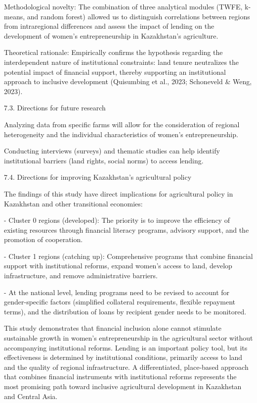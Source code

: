\documentclass[
]{article}
\begin{document}
Methodological novelty: The combination of three analytical modules
(TWFE, k-means, and random forest) allowed us to distinguish
correlations between regions from intraregional differences and assess
the impact of lending on the development of women's entrepreneurship in
Kazakhstan's agriculture.

Theoretical rationale: Empirically confirms the hypothesis regarding the
interdependent nature of institutional constraints: land tenure
neutralizes the potential impact of financial support, thereby
supporting an institutional approach to inclusive development
(Quisumbing et al., 2023; Schoneveld \& Weng, 2023).

7.3. Directions for future research

Analyzing data from specific farms will allow for the consideration of
regional heterogeneity and the individual characteristics of women's
entrepreneurship.

Conducting interviews (surveys) and thematic studies can help identify
institutional barriers (land rights, social norms) to access lending.

7.4. Directions for improving Kazakhstan's agricultural policy

The findings of this study have direct implications for agricultural
policy in Kazakhstan and other transitional economies:

- Cluster 0 regions (developed): The priority is to improve the
efficiency of existing resources through financial literacy programs,
advisory support, and the promotion of cooperation.

- Cluster 1 regions (catching up): Comprehensive programs that combine
financial support with institutional reforms, expand women's access to
land, develop infrastructure, and remove administrative barriers.

- At the national level, lending programs need to be revised to account
for gender-specific factors (simplified collateral requirements,
flexible repayment terms), and the distribution of loans by recipient
gender needs to be monitored.

This study demonstrates that financial inclusion alone cannot stimulate
sustainable growth in women's entrepreneurship in the agricultural
sector without accompanying institutional reforms. Lending is an
important policy tool, but its effectiveness is determined by
institutional conditions, primarily access to land and the quality of
regional infrastructure. A differentiated, place-based approach that
combines financial instruments with institutional reforms represents the
most promising path toward inclusive agricultural development in
Kazakhstan and Central Asia.
\end{document}
